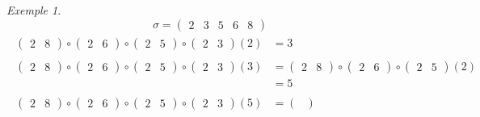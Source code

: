 \documentclass{report}
\theoremstyle{definition}
\theoremstyle{remark}
\newtheorem*{exem}{Exemple}
\begin{document}
	\begin{exem}
		\[
		\sigma = \begin{pmatrix}
			2&3&5&6&8
		\end{pmatrix}
		\]
		\begin{align*}
			\begin{split}
				\begin{pmatrix}
					2&8
				\end{pmatrix} \circ \begin{pmatrix}
					2&6
				\end{pmatrix} \circ \begin{pmatrix}
					2&5
				\end{pmatrix} \circ \begin{pmatrix}
					2&3
				\end{pmatrix}(2)&= 3
			\end{split}\tag{2}
			\\[8pt]
			\begin{split}
				\begin{pmatrix}
					2&8
				\end{pmatrix} \circ \begin{pmatrix}
					2&6
				\end{pmatrix} \circ \begin{pmatrix}
					2&5
				\end{pmatrix} \circ \begin{pmatrix}
					2&3
				\end{pmatrix}(3)&= \begin{pmatrix}
					2&8
				\end{pmatrix} \circ \begin{pmatrix}
					2&6
				\end{pmatrix} \circ \begin{pmatrix}
					2&5
				\end{pmatrix}(2)\\
				&= 5
			\end{split}\tag{3}
			\\[8pt]
			\begin{split}
				\begin{pmatrix}
					2&8
				\end{pmatrix} \circ \begin{pmatrix}
					2&6
				\end{pmatrix} \circ \begin{pmatrix}
					2&5
				\end{pmatrix} \circ \begin{pmatrix}
					2&3
				\end{pmatrix}(5)&= \begin{pmatrix}

\end{pmatrix}
\end{split}
\end{align*}
\end{exem}
\end{document}

